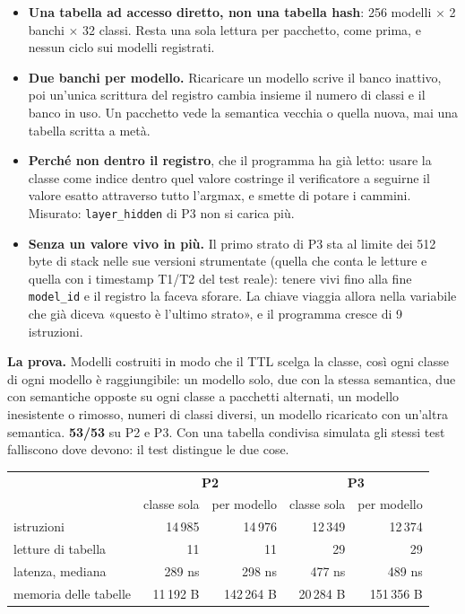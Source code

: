 \documentclass[11pt,a4paper,oneside]{report}
\begin{document}
\begin{itemize}
\item \textbf{Una tabella ad accesso diretto, non una tabella hash}: 256 modelli
      $\times$ 2 banchi $\times$ 32 classi. Resta una sola lettura per pacchetto,
      come prima, e nessun ciclo sui modelli registrati.
\item \textbf{Due banchi per modello.} Ricaricare un modello scrive il banco
      inattivo, poi un'unica scrittura del registro cambia insieme il numero di
      classi e il banco in uso. Un pacchetto vede la semantica vecchia o quella
      nuova, mai una tabella scritta a metà.
\item \textbf{Perché non dentro il registro}, che il programma ha già letto: usare
      la classe come indice dentro quel valore costringe il verificatore a
      seguirne il valore esatto attraverso tutto l'argmax, e smette di potare i
      cammini. Misurato: \texttt{layer\_hidden} di P3 non si carica più.
\item \textbf{Senza un valore vivo in più.} Il primo strato di P3 sta al
      limite dei 512 byte di stack nelle sue versioni strumentate (quella che
      conta le letture e quella con i timestamp T1/T2 del test reale): tenere
      vivi fino alla fine \texttt{model\_id} e il registro la faceva sforare. La
      chiave viaggia allora nella variabile che già diceva «questo è l'ultimo
      strato», e il programma cresce di 9 istruzioni.
\end{itemize}

\textbf{La prova.} Modelli costruiti in modo che il TTL scelga la classe, così
ogni classe di ogni modello è raggiungibile: un modello solo, due con la stessa
semantica, due con semantiche opposte su ogni classe a pacchetti alternati, un
modello inesistente o rimosso, numeri di classi diversi, un modello ricaricato
con un'altra semantica. \textbf{53/53} su P2 e P3. Con una tabella condivisa
simulata gli stessi test falliscono dove devono: il test distingue le due cose.

\begin{center}
\small
\begin{tabular}{@{}lrrrr@{}}
\toprule
& \multicolumn{2}{c}{\textbf{P2}} & \multicolumn{2}{c}{\textbf{P3}} \\
& classe sola & per modello & classe sola & per modello \\
\midrule
istruzioni          & 14\,985 & 14\,976 & 12\,349 & 12\,374 \\
letture di tabella  & 11 & 11 & 29 & 29 \\
latenza, mediana    & 289 ns & 298 ns & 477 ns & 489 ns \\
memoria delle tabelle & 11\,192 B & 142\,264 B & 20\,284 B & 151\,356 B \\
\bottomrule
\end{tabular}
\end{center}
\end{document}
